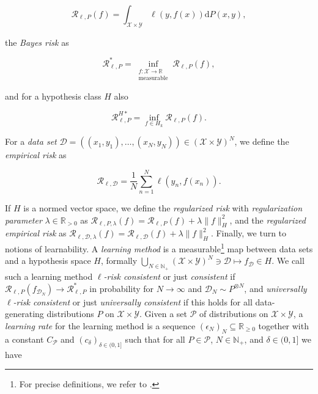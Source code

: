 \documentclass[letterpaper]{article} %
\newcommand{\R}{\mathbb{R}}
\newcommand{\Rnn}{\R_{\geq 0}}
\newcommand{\Rp}{\R_{> 0}}
\newcommand{\Np}{\mathbb{N}_+}
\newcommand{\distr}{\sim}
\newcommand{\inputSet}{\mathcal{X}} %
\newcommand{\outputSet}{\mathcal{Y}} %
\newcommand{\dataSet}{\mathcal{D}}
\newcommand{\risk}{\mathcal{R}} %
\newcommand{\Risk}[2]{\risk_{{#1},{#2}}} %
\newcommand{\RiskBayes}[2]{\risk_{{#1},{#2}}^\ast} %
\newcommand{\RiskReg}[3]{\risk_{{#1},{#2},{#3}}} %
\newcommand{\RiskOpt}[3]{\Risk{#1}{#2}^{#3\ast}}
\newcommand{\defm}[1]{\emph{#1}}
\newif\ifNotMuchSpace
\begin{document}
\ifNotMuchSpace
$\Risk{\ell}{P}(f)=\int_{\inputSet\times\outputSet} \ell(y,f(x))\mathrm{d}P(x,y)$,
\else
\begin{equation*}
    \Risk{\ell}{P}(f)=\int_{\inputSet\times\outputSet} \ell(y,f(x))\mathrm{d}P(x,y),
\end{equation*}
\fi
the \defm{Bayes risk} as
\ifNotMuchSpace
$ \RiskBayes{\ell}{P} = \inf\{ \Risk{\ell}{P}(f) \mid f:\inputSet\rightarrow\R, \: \text{measurable}\}$,
\else
\begin{equation*}
     \RiskBayes{\ell}{P} = \inf_{\substack{f:\inputSet\rightarrow\R\\\text{measurable}}} \Risk{\ell}{P}(f),
\end{equation*}
\fi
and for a hypothesis class $H$ also
\ifNotMuchSpace
$ \RiskOpt{\ell}{P}{H} = \inf\{ \Risk{\ell}{P}(f) \mid f \in H \}$.
\else
\begin{equation*}
     \RiskOpt{\ell}{P}{H} = \inf_{f \in H_k} \Risk{\ell}{P}(f).
\end{equation*}
\fi
For a \defm{data set} $\dataSet=((x_1,y_1),\ldots,(x_N,y_N))\in(\inputSet\times\outputSet)^N$,
we define the \defm{empirical risk} as
\ifNotMuchSpace
$ \Risk{\ell}{\dataSet} = \frac1N \sum_{n=1}^N \ell(y_n,f(x_n))$.
\else
\begin{equation*}
     \Risk{\ell}{\dataSet} = \frac1N \sum_{n=1}^N \ell(y_n,f(x_n)).
\end{equation*}
\fi
If $H$ is a normed vector space, we define the \defm{regularized risk} with \defm{regularization parameter} $\lambda\in\Rp$ as
$\RiskReg{\ell}{P}{\lambda}(f) = \Risk{\ell}{P}(f) + \lambda\|f\|_H^2$,
and the \defm{regularized empirical risk} as 
$\RiskReg{\ell}{\dataSet}{\lambda}(f) = \Risk{\ell}{\dataSet}(f) + \lambda\|f\|_H^2$.
Finally, we turn to notions of learnability.
A \defm{learning method} is a measurable\footnote{For precise definitions, we refer to \cite[Chapter~6]{SC08}.} map between data sets and a hypothesis space $H$, formally $\bigcup_{N\in\Np} (\inputSet\times\outputSet)^N \ni \dataSet \mapsto f_\dataSet \in H$.
We call such a learning method \defm{$\ell$-risk consistent} or just \defm{consistent} if $\Risk{\ell}{P}(f_{\dataSet_N}) \rightarrow \RiskBayes{\ell}{P}$ in probability for $N\rightarrow \infty$ and $\dataSet_N\distr P^{\otimes N}$, and \defm{universally $\ell$-risk consistent} or just \defm{universally consistent} if this holds for all data-generating distributions $P$ on $\inputSet\times\outputSet$.
Given a set $\mathcal{P}$ of distributions on $\inputSet\times\outputSet$, a \defm{learning rate} for the learning method is a sequence $(\epsilon_N)_N\subseteq\Rnn$ together with a constant $C_\mathcal{P}$ and $(c_\delta)_{\delta\in(0,1]}$ such that for all $P\in\mathcal{P}$, $N\in\Np$, and $\delta\in(0,1]$ we have
\end{document}
